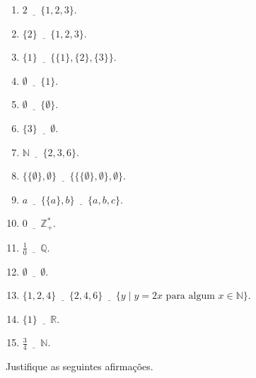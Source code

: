 \begin{enumerate}
	\item $2 \underline{ \ \ \ \ \ \ } \{1, 2, 3\}$.
	\item $\{2\} \underline{ \ \ \ \ \ \ } \{1, 2, 3\}$.
	\item $\{1\} \underline{ \ \ \ \ \ \ } \{\{1\}, \{2\}, \{3\}\}$.
	\item $\emptyset \underline{ \ \ \ \ \ \ } \{1\}$.
	\item $\emptyset \underline{ \ \ \ \ \ \ } \{\emptyset\}$.
	\item $\{3\} \underline{ \ \ \ \ \ \ } \emptyset$.
	\item $\mathbb{N} \underline{ \ \ \ \ \ \ } \{2, 3, 6\}$.
	\item $\{\{\emptyset\}, \emptyset\} \underline{ \ \ \ \ \ \ } \{\{\{\emptyset\}, \emptyset\}, \emptyset\}$.
	\item $a \underline{ \ \ \ \ \ \ } \{\{a\}, b\} \underline{ \ \ \ \ \ \ } \{a, b, c\}$.
	\item $0 \underline{ \ \ \ \ \ \ }  \mathbb{Z}_+^*$.
	\item $\frac{1}{0} \underline{ \ \ \ \ \ \ }  \mathbb{Q}$.
	\item $\emptyset \underline{ \ \ \ \ \ \ }  \emptyset$.
	\item $\{1, 2, 4\} \underline{ \ \ \ \ \ \ }  \{2, 4, 6\} \underline{ \ \ \ \ \ \ } \{y \mid y = 2x \mbox{ para algum } x \in \mathbb{N}\}$.
	\item $\{1\} \underline{ \ \ \ \ \ \ }  \mathbb{R}$.
	\item $\frac{3}{4} \underline{ \ \ \ \ \ \ }  \mathbb{N}$.
\end{enumerate}

\begin{exercise}\label{exerc:Conjuntos7}
	Justifique as seguintes afirmações.
\end{exercise}

